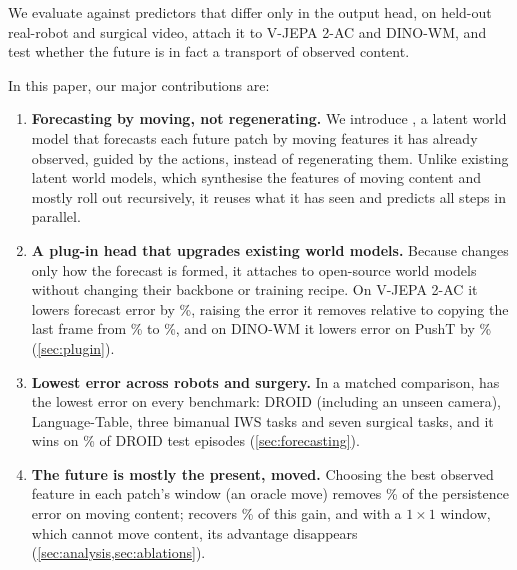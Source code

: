 We evaluate \ours{} against predictors that differ only in the output head, on held-out real-robot and surgical
video, attach it to V-JEPA 2-AC and DINO-WM, and test whether the future is in fact a transport of observed content.

In this paper, our major contributions are:
\begin{enumerate}[label=\arabic*.,leftmargin=1.3em,itemsep=0pt,topsep=1pt,parsep=0pt]
  \item \textbf{Forecasting by moving, not regenerating.} We introduce \ours{}, a latent world model that forecasts each
  future patch by moving features it has already observed, guided by the actions, instead of regenerating them. Unlike
  existing latent world models, which synthesise the features of moving content and mostly roll out recursively, it
  reuses what it has seen and predicts all steps in parallel.
  \item \textbf{A plug-in head that upgrades existing world models.} Because \ours{} changes only how the forecast is
  formed, it attaches to open-source world models without changing their backbone or training recipe. On V-JEPA 2-AC it
  lowers forecast error by \vjepaMSERed\%, raising the error it removes relative to copying the last frame from
  \vjepaSkillFT\% to \vjepaSkillOurs\%, and on DINO-WM it lowers error on PushT by \dinowmPushtErrRed\%
  (\cref{sec:plugin}).
  \item \textbf{Lowest error across robots and surgery.} In a matched comparison, \ours{} has the lowest error on every
  benchmark: DROID (including an unseen camera), Language-Table, three bimanual IWS tasks and seven surgical tasks,
  and it wins on \wmWinDirect\% of DROID test episodes (\cref{sec:forecasting}).
  \item \textbf{The future is mostly the present, moved.} Choosing the best observed feature in each patch's window (an
  oracle move) removes \geoOracleRed\% of the persistence error on moving content; \ours{} recovers \geoShareShift\% of
  this gain, and with a $1{\times}1$ window, which cannot move content, its advantage disappears
  (\cref{sec:analysis,sec:ablations}).
\end{enumerate}
